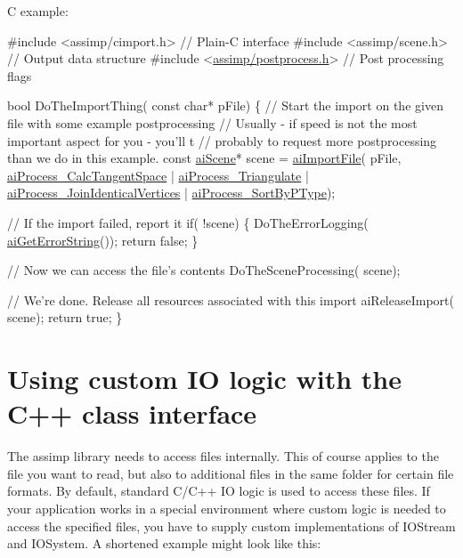 C example\+: 
\begin{DoxyCode}
\textcolor{preprocessor}{#include <assimp/cimport.h>}        \textcolor{comment}{// Plain-C interface}
\textcolor{preprocessor}{#include <assimp/scene.h>}          \textcolor{comment}{// Output data structure}
\textcolor{preprocessor}{#include <\hyperlink{postprocess_8h}{assimp/postprocess.h}>}    \textcolor{comment}{// Post processing flags}

\textcolor{keywordtype}{bool} DoTheImportThing( \textcolor{keyword}{const} \textcolor{keywordtype}{char}* pFile)
\{
  \textcolor{comment}{// Start the import on the given file with some example postprocessing}
  \textcolor{comment}{// Usually - if speed is not the most important aspect for you - you'll t}
  \textcolor{comment}{// probably to request more postprocessing than we do in this example.}
  \textcolor{keyword}{const} \hyperlink{structai_scene}{aiScene}* scene = \hyperlink{_assimp_8cpp_a991846be600bc8a54f6878e5bca96907}{aiImportFile}( pFile, 
    \hyperlink{postprocess_8h_a64795260b95f5a4b3f3dc1be4f52e410a8857a0e30688127a82c7b8939958c6dc}{aiProcess\_CalcTangentSpace}       | 
    \hyperlink{postprocess_8h_a64795260b95f5a4b3f3dc1be4f52e410a9c3de834f0307f31fa2b1b6d05dd592b}{aiProcess\_Triangulate}            |
    \hyperlink{postprocess_8h_a64795260b95f5a4b3f3dc1be4f52e410a444a6c9d8b63e6dc9e1e2e1edd3cbcd4}{aiProcess\_JoinIdenticalVertices}  |
    \hyperlink{postprocess_8h_a64795260b95f5a4b3f3dc1be4f52e410ab4484f73635d633cd79973bac1431ed6}{aiProcess\_SortByPType});

  \textcolor{comment}{// If the import failed, report it}
  \textcolor{keywordflow}{if}( !scene)
  \{
    DoTheErrorLogging( \hyperlink{_assimp_8cpp_a2f826c7b55e774c32de6132e057a239f}{aiGetErrorString}());
    \textcolor{keywordflow}{return} \textcolor{keyword}{false};
  \}

  \textcolor{comment}{// Now we can access the file's contents}
  DoTheSceneProcessing( scene);

  \textcolor{comment}{// We're done. Release all resources associated with this import}
  aiReleaseImport( scene);
  \textcolor{keywordflow}{return} \textcolor{keyword}{true};
\}
\end{DoxyCode}
\hypertarget{usage_custom_io}{}\section{Using custom I\+O logic with the C++ class interface}\label{usage_custom_io}
The assimp library needs to access files internally. This of course applies to the file you want to read, but also to additional files in the same folder for certain file formats. By default, standard C/\+C++ I\+O logic is used to access these files. If your application works in a special environment where custom logic is needed to access the specified files, you have to supply custom implementations of I\+O\+Stream and I\+O\+System. A shortened example might look like this\+:


